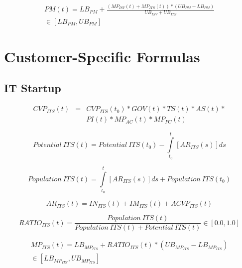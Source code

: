 \begin{eqnarray}
	PM(t) = LB_{PM} + \frac{(MP_{ISV}(t) + MP_{ITS}(t)) * (UB_{PM} - LB_{PM})}{UB_{ISV} + UB_{ITS}} \nonumber \\ \in [LB_{PM},UB_{PM}]
\end{eqnarray}

\section{Customer-Specific Formulas}\label{ch:app04:csf}


\subsection{IT Startup}\label{ch:app04:csf:its}

\begin{eqnarray}
		CVP_{ITS}(t) & = & CVP_{ITS}(t_0) * GOV(t) * TS(t) * AS(t) * \nonumber \\ & & PI(t) * MP_{AC}(t) * MP_{PC}(t)
\end{eqnarray}

\begin{equation}
	\mathit{Potential~ITS(t)} =\mathit{Potential~ITS(t_0)} - \int\limits_{t_0}^t  [AR_{ITS}(s)]ds
\end{equation}

\begin{equation}
	\mathit{Population~ITS(t)} = \int\limits_{t_0}^t [AR_{ITS}(s)]ds + \mathit{Population~ITS(t_0)}
\end{equation}

\begin{equation}
		AR_{ITS}(t) = IN_{ITS}(t) + IM_{ITS}(t) + ACVP_{ITS}(t)	
\end{equation}

\begin{equation}
		RATIO_{ITS}(t) = \frac{\mathit{Population~ITS(t)}}{\mathit{Population~ITS(t)} + \mathit{Potential~ITS(t)}} \in [0.0,1.0]
\end{equation}

\begin{eqnarray}\label{eq:mp:its}
	MP_{ITS}(t) = LB_{MP_{ITS}} + RATIO_{ITS}(t) * (UB_{MP_{ITS}} - LB_{MP_{ITS}})  \nonumber \\ \in [LB_{MP_{ITS}},UB_{MP_{ITS}}]
\end{eqnarray}

